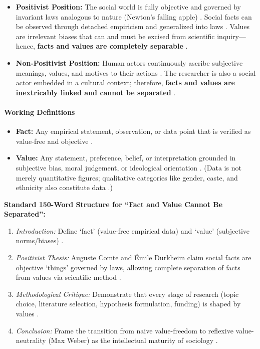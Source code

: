 \begin{ComparisonBox}
\begin{itemize}
    \item \textbf{Positivist Position:} The social world is fully objective and governed by invariant laws analogous to nature (Newton's falling apple) . Social facts can be observed through detached empiricism and generalized into laws . Values are irrelevant biases that can and must be excised from scientific inquiry---hence, \textbf{facts and values are completely separable} .
    \item \textbf{Non-Positivist Position:} Human actors continuously ascribe subjective meanings, values, and motives to their actions . The researcher is also a social actor embedded in a cultural context; therefore, \textbf{facts and values are inextricably linked and cannot be separated} .
\end{itemize}
\end{ComparisonBox}

\paragraph{Working Definitions}
\begin{itemize}
    \item \textbf{Fact:} Any empirical statement, observation, or data point that is verified as value-free and objective .
    \item \textbf{Value:} Any statement, preference, belief, or interpretation grounded in subjective bias, moral judgement, or ideological orientation . (Data is not merely quantitative figures; qualitative categories like gender, caste, and ethnicity also constitute data .)
\end{itemize}

\begin{PYQLink}
\textbf{Standard 150-Word Structure for ``Fact and Value Cannot Be Separated'':}
\begin{enumerate}
    \item \textit{Introduction:} Define `fact' (value-free empirical data) and `value' (subjective norms/biases) .
    \item \textit{Positivist Thesis:} Auguste Comte and Émile Durkheim claim social facts are objective `things' governed by laws, allowing complete separation of facts from values via scientific method .
    \item \textit{Methodological Critique:} Demonstrate that every stage of research (topic choice, literature selection, hypothesis formulation, funding) is shaped by values .
    \item \textit{Conclusion:} Frame the transition from naive value-freedom to reflexive value-neutrality (Max Weber) as the intellectual maturity of sociology .
\end{enumerate}
\end{PYQLink}

